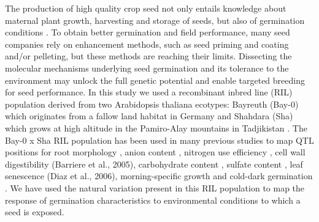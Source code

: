 The production of high quality crop seed not only entails knowledge about maternal plant growth, 
harvesting and storage of seeds, but also of germination conditions \cite{Rivero-Lepinckas:2006}. 
To obtain better germination and field performance, many seed companies rely on enhancement methods, 
such as seed priming and coating and/or pelleting, but these methods are reaching their limits. 
Dissecting the molecular mechanisms underlying seed germination and its tolerance to the environment 
may unlock the full genetic potential and enable targeted breeding for seed performance. In this study 
we used a recombinant inbred line (RIL) population derived from two Arabidopsis thaliana ecotypes: 
Bayreuth (Bay-0) which originates from a fallow land habitat in Germany and Shahdara (Sha) which 
grows at high altitude in the Pamiro-Alay mountains in Tadjikistan \cite{Loudet:2002}. The Bay-0 x 
Sha RIL population has been used in many previous studies to map QTL positions for root morphology 
\cite{Loudet:2005, Reymond:2006}, anion content \cite{Loudet:2003a}, nitrogen use efficiency 
\cite{Loudet:2003b}, cell wall digestibility (Barriere et al., 2005), carbohydrate content 
\cite{Calenge:2006}, sulfate content \cite{Loudet:2007}, leaf senescence (Diaz et al., 2006), 
morning-specific growth \cite{Loudet:2008} and cold-dark germination \cite{Meng:2008}. We have used 
the natural variation present in this RIL population to map the response of germination characteristics 
to environmental conditions to which a seed is exposed.

